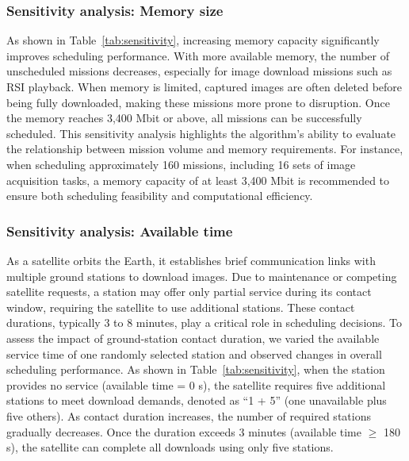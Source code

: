 \documentclass[preprint,3p,12pt,authoryear]{elsarticle}
\begin{document}
\subsubsection{Sensitivity analysis: Memory size}
As shown in Table~\ref{tab:sensitivity}, increasing memory capacity significantly improves scheduling performance. With more available memory, the number of unscheduled missions decreases, especially for image download missions such as RSI playback. When memory is limited, captured images are often deleted before being fully downloaded, making these missions more prone to disruption. Once the memory reaches 3,400 Mbit or above, all missions can be successfully scheduled. This sensitivity analysis highlights the algorithm’s ability to evaluate the relationship between mission volume and memory requirements. For instance, when scheduling approximately 160 missions, including 16 sets of image acquisition tasks, a memory capacity of at least 3,400 Mbit is recommended to ensure both scheduling feasibility and computational efficiency.

\subsubsection{Sensitivity analysis: Available time}
As a satellite orbits the Earth, it establishes brief communication links with multiple ground stations to download images. Due to maintenance or competing satellite requests, a station may offer only partial service during its contact window, requiring the satellite to use additional stations. These contact durations, typically 3 to 8 minutes, play a critical role in scheduling decisions. To assess the impact of ground-station contact duration, we varied the available service time of one randomly selected station and observed changes in overall scheduling performance. As shown in Table~\ref{tab:sensitivity}, when the station provides no service (available time = 0 s), the satellite requires five additional stations to meet download demands, denoted as “1 + 5” (one unavailable plus five others). As contact duration increases, the number of required stations gradually decreases. Once the duration exceeds 3 minutes (available time $\ge$ 180 s), the satellite can complete all downloads using only five stations.
\end{document}
